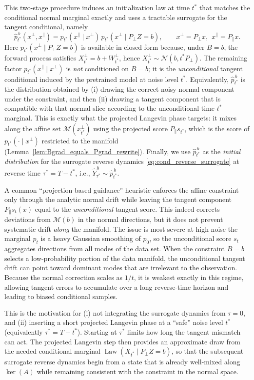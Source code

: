 \documentclass[twoside,11pt]{article}
\newcommand{\Nc}{\mathcal{N}}
\newcommand{\Mc}{\mathcal{M}}
\newcommand{\Law}{\operatorname{Law}}
\numberwithin{equation}{section}
\begin{document}
This two-stage procedure induces an initialization law at time \(t^*\) that matches the conditional normal marginal
exactly and uses a tractable surrogate for the tangent conditional, namely
\[
\hat p_{t^*}^{\,b}(x^{\perp},x^{\parallel})
=
p_{t^*}(x^{\parallel}\mid x^{\perp})\,p_{t^*}(x^{\perp}\mid P_{\perp}Z =b),
\qquad
x^{\perp}=P_{\perp}x,\ \ x^{\parallel}=P_{\parallel}x.
\]
Here \(p_{t^*}(x^\perp\mid P_{\perp}Z =b)\) is available in closed form because, under \(B=b\), the forward process
satisfies \(X_{t^*}^\perp=b+W_{t^*}^\perp\), hence \(X_{t^*}^\perp\sim\Nc(b,t^*P_\perp)\). The remaining factor
\(p_{t^*}(x^\parallel\mid x^\perp)\) is \emph{not} conditioned on \(B=b\); it is the \emph{unconditional} tangent
conditional induced by the pretrained model at noise level \(t^*\). Equivalently, \(\hat p_{t^*}^{\,b}\) is the
distribution obtained by (i) drawing the correct noisy normal component under the constraint, and then (ii) drawing a
tangent component that is compatible with that normal slice according to the unconditional time-\(t^*\) marginal.
This is exactly what the projected Langevin phase targets: it mixes along the affine set \(\Mc(x^\perp_{t^*})\) using the
projected score \(P_\parallel s_{t^*}\), which is the score of \(p_{t^*}(\cdot\mid x^\perp)\) restricted to the
manifold (Lemma~\ref{lem:Bgrad_equals_Pgrad_rewrite}). Finally, we use \(\hat p_{t^*}^{\,b}\) as the \emph{initial
distribution} for the surrogate reverse dynamics \eqref{eq:cond_reverse_surrogate} at reverse time
\(\tau^*=T-t^*\), i.e., \(\hat Y_{\tau^*}^{\,b}\sim \hat p_{t^*}^{\,b}\).


\begin{remark}
A common ``projection-based guidance'' heuristic enforces the affine constraint only through the analytic normal drift
while leaving the tangent component \(P_{\parallel}s_t(x)\) equal to the \emph{unconditional} tangent score.
This indeed corrects deviations from \(\Mc(b)\) in the normal directions, but it does not prevent systematic drift
\emph{along} the manifold. The issue is most severe at high noise 
the marginal \(p_t\) is a heavy Gaussian smoothing of \(p_0\), so the unconditional score \(s_t\) aggregates directions
from all modes of the data set. When the constraint \(B=b\) selects a low-probability portion of the data manifold,
the unconditional tangent drift can point toward dominant modes that are irrelevant to the observation. Because the
normal correction scales as \(1/t\), it is weakest exactly in this regime, allowing tangent errors to accumulate over a
long reverse-time horizon and leading to biased conditional samples.

This is the motivation for (i) not integrating the surrogate dynamics from \(\tau=0\), and (ii) inserting a short
projected Langevin phase at a ``safe'' noise level \(t^*\) (equivalently \(\tau^*=T-t^*\)). Starting at \(\tau^*\)
limits how long the tangent mismatch can act. The projected Langevin step then provides an approximate draw from the
needed conditional marginal \(\Law(X_{t^*}\mid P_{\perp}Z =b)\), so that the subsequent surrogate reverse dynamics begin from a
state that is already well-mixed along \(\ker(A)\) while remaining consistent with the constraint in the normal space.
\end{remark}
\end{document}
